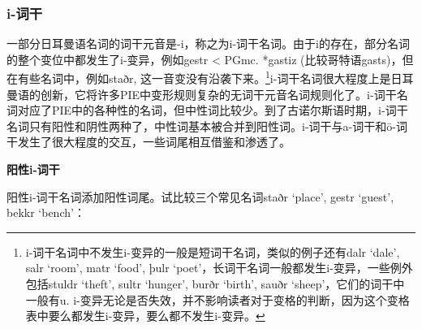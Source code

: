 \subsubsection{i-词干}\label{i-词干}

一部分日耳曼语名词的词干元音是-i，称之为i-词干名词。由于i的存在，部分名词的整个变位中都发生了i-变异，例如gestr
\textless{} PGmc. *gastiz (比较哥特语gasts)，但在有些名词中，例如staðr,
这一音变没有沿袭下来。\footnote{i-词干名词中不发生i-变异的一般是短词干名词，类似的例子还有dalr
  `dale', salr `room', matr `food', þulr
  `poet'，长词干名词一般都发生i-变异，一些例外包括stuldr `theft', sultr
  `hunger', burðr `birth', sauðr `sheep'，它们的词干中一般有u.
  i-变异无论是否失效，并不影响读者对于变格的判断，因为这个变格表中要么都发生i-变异，要么都不发生i-变异。}i-词干名词很大程度上是日耳曼语的创新，它将许多PIE中变形规则复杂的无词干元音名词规则化了。i-词干名词对应了PIE中的各种性的名词，但中性词比较少。到了古诺尔斯语时期，i-词干名词只有阳性和阴性两种了，中性词基本被合并到阳性词。i-词干与a-词干和ō-词干发生了很大程度的交互，一些词尾相互借鉴和渗透了。

\textbf{阳性i-词干}

阳性i-词干名词添加阳性词尾。试比较三个常见名词staðr `place', gestr
`guest', bekkr `bench'：


